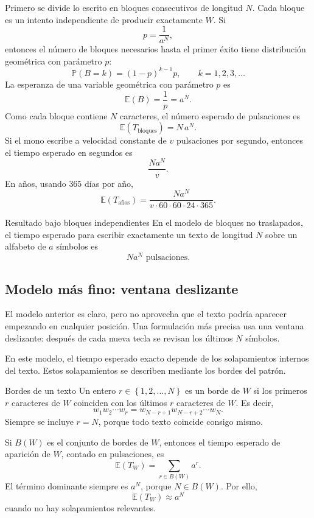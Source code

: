 \documentclass[12pt,a4paper]{article}
\newcommand{\E}{\mathbb{E}}
\newcommand{\Prob}{\mathbb{P}}
\newcommand{\set}[1]{\left\{#1\right\}}
\theoremstyle{definition}
\begin{document}
Primero se divide lo escrito en bloques consecutivos de longitud \(N\). Cada bloque es un intento independiente de producir exactamente \(W\). Si
\[
    p=\frac1{a^N},
\]
entonces el número de bloques necesarios hasta el primer éxito tiene distribución geométrica con parámetro \(p\):
\[
    \Prob(B=k)=(1-p)^{k-1}p,
    \qquad k=1,2,3,\ldots
\]
La esperanza de una variable geométrica con parámetro \(p\) es
\[
    \E(B)=\frac1p=a^N.
\]
Como cada bloque contiene \(N\) caracteres, el número esperado de pulsaciones es
\[
    \E(T_{\text{bloques}})=N\,a^N.
\]
Si el mono escribe a velocidad constante de \(v\) pulsaciones por segundo, entonces el tiempo esperado en segundos es
\[
    \frac{N a^N}{v}.
\]
En años, usando \(365\) días por año,
\[
    \boxed{
    \E(T_{\text{años}})=
    \frac{N a^N}{v\cdot 60\cdot 60\cdot 24\cdot 365}
    }.
\]

\begin{cajaResultado}{Resultado bajo bloques independientes}
En el modelo de bloques no traslapados, el tiempo esperado para escribir exactamente un texto de longitud \(N\) sobre un alfabeto de \(a\) símbolos es
\[
    \boxed{N a^N\text{ pulsaciones}.}
\]
\end{cajaResultado}

\subsection{Modelo más fino: ventana deslizante}

El modelo anterior es claro, pero no aprovecha que el texto podría aparecer empezando en cualquier posición. Una formulación más precisa usa una ventana deslizante: después de cada nueva tecla se revisan los últimos \(N\) símbolos.

En este modelo, el tiempo esperado exacto depende de los solapamientos internos del texto. Estos solapamientos se describen mediante los bordes del patrón.

\begin{cajaIdea}{Bordes de un texto}
Un entero \(r\in\set{1,2,\ldots,N}\) es un borde de \(W\) si los primeros \(r\) caracteres de \(W\) coinciden con los últimos \(r\) caracteres de \(W\). Es decir,
\[
    w_1w_2\cdots w_r=w_{N-r+1}w_{N-r+2}\cdots w_N.
\]
Siempre se incluye \(r=N\), porque todo texto coincide consigo mismo.
\end{cajaIdea}

Si \(B(W)\) es el conjunto de bordes de \(W\), entonces el tiempo esperado de aparición de \(W\), contado en pulsaciones, es
\[
    \E(T_W)=\sum_{r\in B(W)}a^r.
\]
El término dominante siempre es \(a^N\), porque \(N\in B(W)\). Por ello,
\[
    \E(T_W)\approx a^N
\]
cuando no hay solapamientos relevantes.
\end{document}
